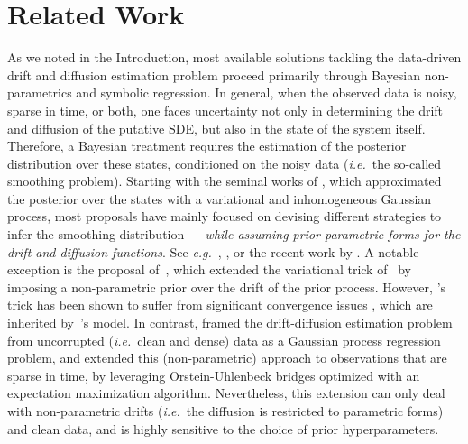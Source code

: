 \section{Related Work}
\label{sec:related-work}

As we noted in the Introduction, most available solutions tackling the 
data-driven drift and diffusion estimation problem proceed primarily through Bayesian non-parametrics and symbolic regression.
%
In general, when the observed data is noisy, sparse in time, or both, one faces uncertainty not only in determining the drift and diffusion of the putative SDE, but also in the state of the system itself.
%
Therefore, a Bayesian treatment requires the estimation of the posterior distribution over these states, conditioned on the noisy data (\textit{i.e.}~the so-called smoothing problem).
%
Starting with the seminal works of \citet{archambeau2007gaussian, archambeau2007variational}, which approximated the posterior over the states with a variational and inhomogeneous Gaussian process, 
most proposals have mainly focused on devising different strategies to infer the smoothing distribution --- \textit{while assuming prior parametric forms for the drift and diffusion functions}. See \textit{e.g.}~\citet{VRETTAS20111877}, \citet{wildner2021moment}, or the recent work by \citet{verma2024variational}.
%
A notable exception is the proposal of~\citet{duncker2019learning},  which extended the variational trick of~\citet{archambeau2007gaussian} by imposing a non-parametric prior over the drift of the prior process.
%
However, \citet{archambeau2007gaussian}'s trick has been shown to suffer from significant convergence issues \cite{verma2024variational}, which are inherited by~\citet{duncker2019learning}'s model.
%
In contrast, \citet{batz2018approximate} framed the drift-diffusion estimation problem from uncorrupted (\textit{i.e.}~clean and dense) data as a Gaussian process regression problem,
%
and extended this (non-parametric) approach to observations that are sparse in time, by leveraging Orstein-Uhlenbeck bridges optimized with an expectation maximization algorithm.
%
Nevertheless, this extension can only deal with non-parametric drifts (\textit{i.e.}~the diffusion is restricted to parametric forms) and clean data, and is highly sensitive to the choice of prior hyperparameters.
%


